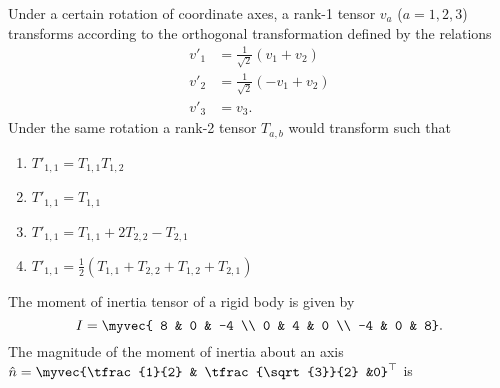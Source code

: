 \item Under a certain rotation of coordinate axes, a rank-1 tensor $v_a$ ($a=1,2,3$) transforms according to the orthogonal transformation defined by the relations
	\begin{align*}	 v'_1 &= \frac{1}{\sqrt{2}}(v_1 + v_2)\\ v'_2 &=\frac{1}{\sqrt{2}}(-v_1 + v_2) \\ v'_3 &= v_3.\end{align*}
Under the same rotation a rank-2 tensor $T_{a,b}$ would transform such that
\hfill{}
\begin{multicols}{2}
	\begin{enumerate}[itemsep=1ex]
        \item $T'_{1,1} = T_{1,1}  T_{1,2}$
        \item $T'_{1,1} = T_{1,1}$
        \item $T'_{1,1} = T_{1,1} + 2T_{2,2} - T_{2,1}$
        \item $T'_{1,1} = \tfrac{1}{2}(T_{1,1} + T_{2,2} + T_{1,2} + T_{2,1})$
    \end{enumerate}
\end{multicols}
\item The moment of inertia tensor of a rigid body is given by
$$I = \myvec{
8 & 0 & -4 \\
0 & 4 & 0 \\
-4 & 0 & 8}.
$$ The magnitude of the moment of inertia about an axis $\hat{n} = \myvec{\tfrac{1}{2} & \tfrac{\sqrt{3}}{2} &0}^{\top}$ is

